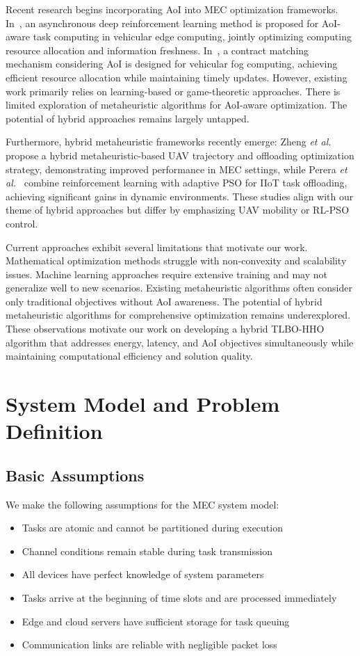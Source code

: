 \documentclass[conference]{IEEEtran}
\begin{document}
Recent research begins incorporating AoI into MEC optimization frameworks. In~\cite{liu2023asynchronous}, an asynchronous deep reinforcement learning method is proposed for AoI-aware task computing in vehicular edge computing, jointly optimizing computing resource allocation and information freshness. In~\cite{zhou2019computation}, a contract matching mechanism considering AoI is designed for vehicular fog computing, achieving efficient resource allocation while maintaining timely updates. However, existing work primarily relies on learning-based or game-theoretic approaches. There is limited exploration of metaheuristic algorithms for AoI-aware optimization. The potential of hybrid approaches remains largely untapped.

Furthermore, hybrid metaheuristic frameworks recently emerge: Zheng \textit{et al.}~\cite{Zheng_2025} propose a hybrid metaheuristic-based UAV trajectory and offloading optimization strategy, demonstrating improved performance in MEC settings, while Perera \textit{et al.}~\cite{Perera_2025} combine reinforcement learning with adaptive PSO for IIoT task offloading, achieving significant gains in dynamic environments. These studies align with our theme of hybrid approaches but differ by emphasizing UAV mobility or RL-PSO control.

Current approaches exhibit several limitations that motivate our work. Mathematical optimization methods struggle with non-convexity and scalability issues. Machine learning approaches require extensive training and may not generalize well to new scenarios. Existing metaheuristic algorithms often consider only traditional objectives without AoI awareness. The potential of hybrid metaheuristic algorithms for comprehensive optimization remains underexplored. These observations motivate our work on developing a hybrid TLBO-HHO algorithm that addresses energy, latency, and AoI objectives simultaneously while maintaining computational efficiency and solution quality.

\section{System Model and Problem Definition}

\subsection{Basic Assumptions}
We make the following assumptions for the MEC system model:
\begin{itemize}
    \item Tasks are atomic and cannot be partitioned during execution
    \item Channel conditions remain stable during task transmission
    \item All devices have perfect knowledge of system parameters
    \item Tasks arrive at the beginning of time slots and are processed immediately
    \item Edge and cloud servers have sufficient storage for task queuing
    \item Communication links are reliable with negligible packet loss
\end{itemize}
\end{document}
